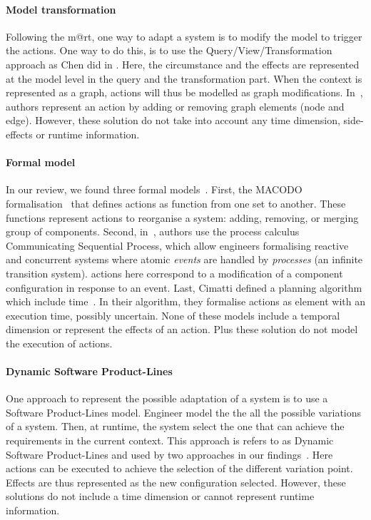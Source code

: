 	
\paragraph{Model transformation}
Following the \gls{m@rt}, one way to adapt a system is to modify the model to trigger the actions.
One way to do this, is to use the Query/View/Transformation~\cite{QVT:Spec} approach as Chen \etal did in \cite{DBLP:conf/icse/ChenPYNZ14}.
Here, the \gls{circumstance} and the effects are represented at the model level in the query and the transformation part.
When the context is represented as a graph, \glspl{action} will thus be modelled as graph modifications.
In~\cite{DBLP:journals/tse/KramerM90}, authors represent an action by adding or removing graph elements (node and edge).
However, these solution do not take into account any time dimension, side-effects or runtime information.
	
\paragraph{Formal model}
In our review, we found three formal models~\cite{DBLP:journals/taas/WeynsHH10, DBLP:conf/icse/BartelsK11, DBLP:conf/aaai/CimattiMR15}.
First, the MACODO formalisation~\cite{DBLP:journals/taas/WeynsHH10} that defines actions as function from one set to another.
These functions represent actions to reorganise a system: adding, removing, or merging group of components.
Second, in~\cite{DBLP:conf/icse/BartelsK11}, authors use the process calculus Communicating Sequential Process, which allow engineers formalising reactive and concurrent systems where atomic \textit{events} are handled by \textit{processes} (an infinite transition system).
\Glspl{action} here correspond to a modification of a component configuration in response to an event.
Last, Cimatti \etal defined a planning algorithm which include time~\cite{DBLP:conf/aaai/CimattiMR15}.
In their algorithm, they formalise \glspl{action} as element with an execution time, possibly uncertain.
None of these models include a temporal dimension or represent the effects of an action.
Plus these solution do not model the execution of \glspl{action}.

\paragraph{Dynamic Software Product-Lines}
One approach to represent the possible adaptation of a system is to use a Software Product-Lines model.
Engineer model the the all the possible variations of a system.
Then, at runtime, the system select the one that can achieve the requirements in the current context.
This approach is refers to as Dynamic Software Product-Lines and used by two approaches in our findings~\cite{DBLP:conf/dagstuhl/GhezziS10, DBLP:series/lncs/CordyCHLS13}.
Here \glspl{action} can be executed to achieve the selection of the different variation point.
Effects are thus represented as the new configuration selected.
However, these solutions do not include a time dimension or cannot represent runtime information.

